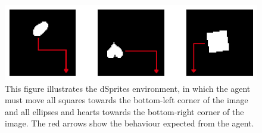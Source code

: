 \documentclass[twoside,11pt]{article}
\begin{document}
\begin{figure}[H]
	\begin{center}
	\includegraphics[scale=2]{dSprites_env}
	\end{center}
  \caption{This figure illustrates the dSprites environment, in which the agent must move all squares towards the bottom-left corner of the image and all ellipses and hearts towards the bottom-right corner of the image. The red arrows show the behaviour expected from the agent.}
   \label{fig:dSprites_env}
\end{figure}
\end{document}
